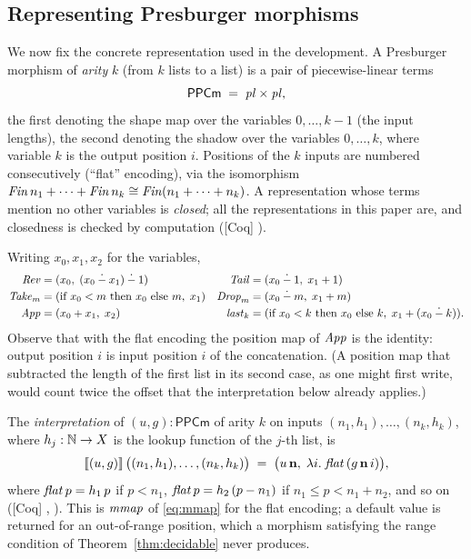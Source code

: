 \documentclass{fundam}
\begin{document}
\subsection{Representing Presburger morphisms}\label{sec:ppcm}

We now fix the concrete representation used in the development.  A Presburger morphism
of \emph{arity} $k$ (from $k$ lists to a list) is a pair of piecewise-linear terms
\[
  \mathsf{PPCm} \;=\; \mathit{pl} \times \mathit{pl},
\]
the first denoting the shape map over the variables $0, \dots, k-1$ (the input lengths),
the second denoting the shadow over the variables $0, \dots, k$, where variable $k$ is the
output position $i$.  Positions of the $k$ inputs are numbered consecutively (``flat''
encoding), via the isomorphism $\mathit{Fin}\,n_1 + \dots + \mathit{Fin}\,n_k \cong \mathit{Fin}(n_1 + \dots + n_k)$.
A representation whose terms mention no other variables is \emph{closed}; all the
representations in this paper are, and closedness is checked by computation
(\textsf{[Coq]} ).

\begin{example}\label{ex:ppcm}
  Writing $x_0, x_1, x_2$ for the variables,
  \begin{align*}
    \mathit{Rev} &= (x_0,\; (x_0 \mathbin{\dot{-}} x_1) \mathbin{\dot{-}} 1) &
    \mathit{Tail} &= (x_0 \mathbin{\dot{-}} 1,\; x_1 + 1) \\
    \mathit{Take}_m &= (\text{if } x_0 < m \text{ then } x_0 \text{ else } m,\; x_1) &
    \mathit{Drop}_m &= (x_0 \mathbin{\dot{-}} m,\; x_1 + m) \\
    \mathit{App} &= (x_0 + x_1,\; x_2) &
    \mathit{last}_k &= (\text{if } x_0 < k \text{ then } x_0 \text{ else } k,\; x_1 + (x_0 \mathbin{\dot{-}} k)).
  \end{align*}
  Observe that with the flat encoding the position map of $\mathit{App}$ is the identity: output
  position $i$ is input position $i$ of the concatenation.  (A position map that subtracted
  the length of the first list in its second case, as one might first write, would count
  twice the offset that the interpretation below already applies.)
\end{example}

The \emph{interpretation} of $(u, g) : \mathsf{PPCm}$ of arity $k$ on inputs
$(n_1, h_1), \dots, (n_k, h_k)$, where $h_j : \mathbb{N} \to X$ is the lookup function of the $j$-th
list, is
\begin{equation}\label{eq:interp}
  \llbracket (u,g) \rrbracket\, \big((n_1,h_1),\dots,(n_k,h_k)\big) \;=\;
  \big(u\,\mathbf{n},\; \lambda i.\; \mathit{flat}\,(g\,\mathbf{n}\,i)\big),
\end{equation}
where $\mathit{flat}\,p = h_1\,p$ if $p < n_1$, $\mathit{flat}\,p = h_2\,(p - n_1)$ if
$n_1 \le p < n_1 + n_2$, and so on (\textsf{[Coq]} , ).  This is
$\mathit{mmap}$ of \eqref{eq:mmap} for the flat encoding; a default value is returned for an
out-of-range position, which a morphism satisfying the range condition of
Theorem~\ref{thm:decidable} never produces.
\end{document}
